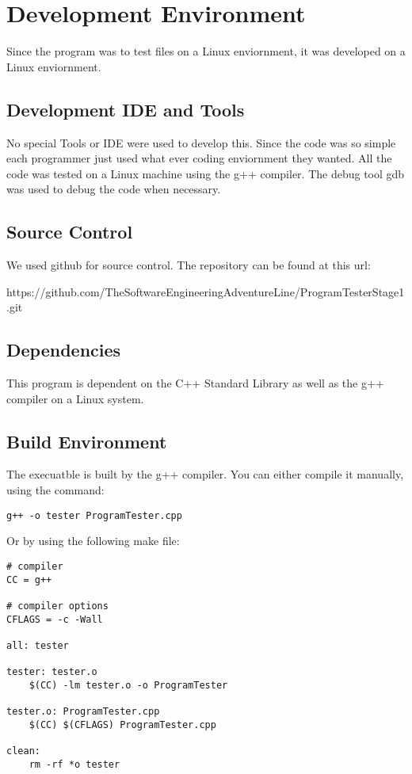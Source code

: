 \chapter{Development Environment}
Since the program was to test files on a Linux enviornment, it was developed
on a Linux enviornment.


\section{Development IDE and Tools}
No special Tools or IDE were used to develop this.  Since the code was so simple
each programmer just used what ever coding enviornment they wanted.  All
the code was tested on a Linux machine using the g++ compiler.  The debug tool
gdb was used to debug the code when necessary.

\section{Source  Control}
We used github for source control.  The repository can be found at this url: 

https://github.com/TheSoftwareEngineeringAdventureLine/ProgramTesterStage1.git

\section{Dependencies}
This program is dependent on the C++ Standard Library as well as the g++ compiler
on a Linux system.

\section{Build  Environment}
The execuatble is built by the g++ compiler.  You can either compile it manually, using the command:
\begin{lstlisting}
g++ -o tester ProgramTester.cpp
\end{lstlisting}
Or by using the following make file:

\begin{lstlisting}
# compiler
CC = g++

# compiler options
CFLAGS = -c -Wall

all: tester

tester: tester.o
	$(CC) -lm tester.o -o ProgramTester

tester.o: ProgramTester.cpp
	$(CC) $(CFLAGS) ProgramTester.cpp

clean:
	rm -rf *o tester
\end{lstlisting}

